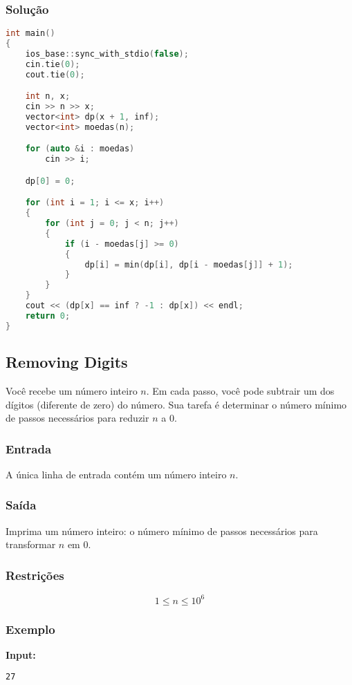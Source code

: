 \subsubsection*{Solução}
\begin{lstlisting}[language=C++]
int main()
{
    ios_base::sync_with_stdio(false);
    cin.tie(0);
    cout.tie(0);

    int n, x;
    cin >> n >> x;
    vector<int> dp(x + 1, inf);
    vector<int> moedas(n);

    for (auto &i : moedas)
        cin >> i;

    dp[0] = 0;

    for (int i = 1; i <= x; i++)
    {
        for (int j = 0; j < n; j++)
        {
            if (i - moedas[j] >= 0)
            {
                dp[i] = min(dp[i], dp[i - moedas[j]] + 1);
            }
        }
    }
    cout << (dp[x] == inf ? -1 : dp[x]) << endl;
    return 0;
}
\end{lstlisting}

\subsection{Removing Digits}
Você recebe um número inteiro \( n \). Em cada passo, você pode subtrair um dos dígitos (diferente de zero) do número. Sua tarefa é determinar o número mínimo de passos necessários para reduzir \( n \) a \( 0 \).

\subsubsection*{Entrada}
A única linha de entrada contém um número inteiro \( n \).

\subsubsection*{Saída}
Imprima um número inteiro: o número mínimo de passos necessários para transformar \( n \) em \( 0 \).

\subsubsection*{Restrições}
\[
1 \le n \le 10^6
\]

\subsubsection*{Exemplo}

\textbf{Input:}
\begin{verbatim}
27
\end{verbatim}

